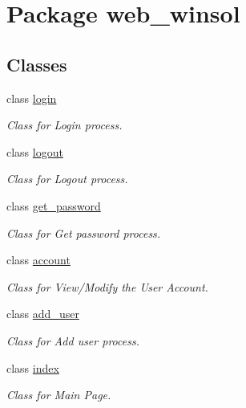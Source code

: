 \hypertarget{namespaceweb__winsol}{
\section{Package web\_\-winsol}
\label{namespaceweb__winsol}
}


\subsection*{Classes}
\begin{CompactItemize}
\item 
class \hyperlink{classweb__winsol_1_1login}{login}
\begin{CompactList}\small\item\em Class for {\em Login\/} process. \item\end{CompactList}\item 
class \hyperlink{classweb__winsol_1_1logout}{logout}
\begin{CompactList}\small\item\em Class for {\em Logout\/} process. \item\end{CompactList}\item 
class \hyperlink{classweb__winsol_1_1get__password}{get\_\-password}
\begin{CompactList}\small\item\em Class for {\em Get\/} {\em password\/} process. \item\end{CompactList}\item 
class \hyperlink{classweb__winsol_1_1account}{account}
\begin{CompactList}\small\item\em Class for View/Modify the User Account. \item\end{CompactList}\item 
class \hyperlink{classweb__winsol_1_1add__user}{add\_\-user}
\begin{CompactList}\small\item\em Class for {\em Add\/} {\em user\/} process. \item\end{CompactList}\item 
class \hyperlink{classweb__winsol_1_1index}{index}
\begin{CompactList}\small\item\em Class for {\em Main\/} {\em Page\/}. \item\end{CompactList}\item 

\end{CompactItemize}
